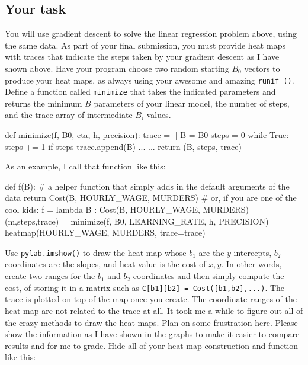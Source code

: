 \begin{fullwidth}
\section{Your task}

You will use gradient descent to solve the linear regression problem above, using the same data. As part of your final submission, you must provide heat maps with traces that indicate the steps taken by your gradient descent as I have shown above.  Have your program choose two random starting $B_0$ vectors to produce your heat maps, as always using your awesome and amazing {\tt runif\_()}.   Define a function called {\tt minimize} that takes the indicated parameters and returns the minimum $B$ parameters of your linear model, the number of steps, and the trace array of intermediate $B_i$ values.

\begin{pyverbatim}
def minimize(f, B0, eta, h, precision):
    trace = []
    B = B0
    steps = 0 
    while True:
        steps += 1
        if steps %
            trace.append(B)
        ...     
    ... 
    return (B, steps, trace)
\end{pyverbatim}

As an example, I call that function like this:

\begin{pyverbatim}
def f(B): # a helper function that simply adds in the default arguments of the data
    return Cost(B, HOURLY_WAGE, MURDERS)
# or, if you are one of the cool kids:
f = lambda B : Cost(B, HOURLY_WAGE, MURDERS)
(m,steps,trace) = minimize(f, B0, LEARNING_RATE, h, PRECISION)
heatmap(HOURLY_WAGE, MURDERS, trace=trace)
\end{pyverbatim}

Use {\tt pylab.imshow()} to draw the heat map whose $b_1$ are the $y$ intercepts, $b_2$ coordinates are the slopes, and heat value is the cost of $x,y$.  In other words, create two ranges for the $b_1$ and $b_2$ coordinates and then simply compute the cost, of storing it in a matrix such as {\tt C[b1][b2] = Cost([b1,b2],...)}.  The trace is plotted on top of the map once you create. The coordinate ranges of the heat map are not related to the trace at all. It took me a while to figure out all of the crazy methods to draw the heat maps.  Plan on some frustration here.  Please show the information as I have shown in the graphs to make it easier to compare results and for me to grade. Hide all of your heat map construction and function like this:


\end{fullwidth}
